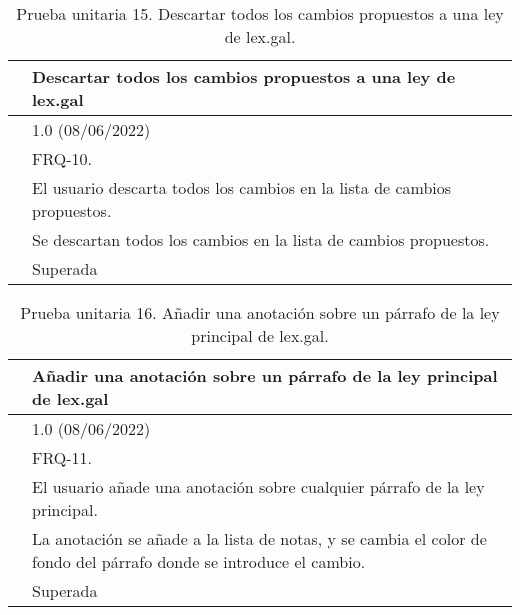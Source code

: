 \begin{table}[H]
\begin{center}
\begin{tabular}{|p{3cm}|p{10cm}|} \hline
\centering {\bf PU-15} & Descartar todos los cambios propuestos a una ley de lex.gal  \\ \hline\hline
\centering {\bf Versión} & 1.0 (08/06/2022) \\ \hline
\centering {\bf Dependencias} & FRQ-10. \\ \hline
\centering {\bf Descripción} &  El usuario descarta todos los cambios en la lista de cambios propuestos. \\ \hline
\centering {\bf Criterio de aceptación} & Se descartan todos los cambios en la lista de cambios propuestos. \\ \hline
\centering {\bf Estado} & Superada \\ \hline
\end{tabular}
\caption{Prueba unitaria 15. Descartar todos los cambios propuestos a una ley de lex.gal.}
\label{enlacePU15}
\end{center}
\end{table}

\begin{table}[H]
\begin{center}
\begin{tabular}{|p{3cm}|p{10cm}|} \hline
\centering {\bf PU-16} & Añadir una anotación sobre un párrafo de la ley principal de lex.gal  \\ \hline\hline
\centering {\bf Versión} & 1.0 (08/06/2022) \\ \hline
\centering {\bf Dependencias} & FRQ-11. \\ \hline
\centering {\bf Descripción} &  El usuario añade una anotación sobre cualquier párrafo de la ley principal. \\ \hline
\centering {\bf Criterio de aceptación} & La anotación se añade a la lista de notas, y se cambia el color de fondo del párrafo donde se introduce el cambio. \\ \hline
\centering {\bf Estado} & Superada \\ \hline
\end{tabular}
\caption{Prueba unitaria 16. Añadir una anotación sobre un párrafo de la ley principal de lex.gal.}
\label{enlacePU16}
\end{center}
\end{table}

